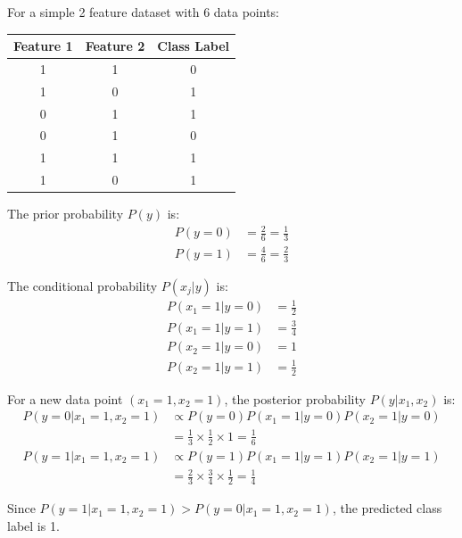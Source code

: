 \documentclass[a4paper,12pt]{article}
\begin{document}
\begin{examplebox}[%
  enhanced, 
  breakable,
  skin first=enhanced,
  skin middle=enhanced,
  skin last=enhanced,
  ]{}
  For a simple 2 feature dataset with 6 data points:
  \begin{table}[H]
    \centering
    \begin{tabular}{ccc}
      \toprule
      \textbf{Feature 1} & \textbf{Feature 2} & \textbf{Class Label} \\
      \midrule
      1 & 1 & 0 \\
      1 & 0 & 1 \\
      0 & 1 & 1 \\
      0 & 1 & 0 \\
      1 & 1 & 1 \\
      1 & 0 & 1 \\
      \bottomrule
    \end{tabular}
  \end{table}

  The prior probability $P(y)$ is:
  \begin{align*}
    P(y = 0) &= \frac{2}{6} = \frac{1}{3} \\
    P(y = 1) &= \frac{4}{6} = \frac{2}{3}
  \end{align*}

  The conditional probability $P(x_j|y)$ is:
  \begin{align*}
    P(x_1 = 1|y = 0) &= \frac{1}{2} \\
    P(x_1 = 1|y = 1) &= \frac{3}{4} \\
    P(x_2 = 1|y = 0) &= 1 \\
    P(x_2 = 1|y = 1) &= \frac{1}{2}
  \end{align*}

  For a new data point $(x_1 = 1, x_2 = 1)$, the posterior probability $P(y|x_1, x_2)$ is:
  \begin{align*}
    P(y = 0|x_1 = 1, x_2 = 1) &\propto P(y = 0) P(x_1 = 1|y = 0) P(x_2 = 1|y = 0) \\
    &= \frac{1}{3} \times \frac{1}{2} \times 1 = \frac{1}{6} \\
    P(y = 1|x_1 = 1, x_2 = 1) &\propto P(y = 1) P(x_1 = 1|y = 1) P(x_2 = 1|y = 1) \\
    &= \frac{2}{3} \times \frac{3}{4} \times \frac{1}{2} = \frac{1}{4}
  \end{align*}

  Since $P(y = 1|x_1 = 1, x_2 = 1) > P(y = 0|x_1 = 1, x_2 = 1)$, the predicted class label is 1.
\end{examplebox}
\end{document}
